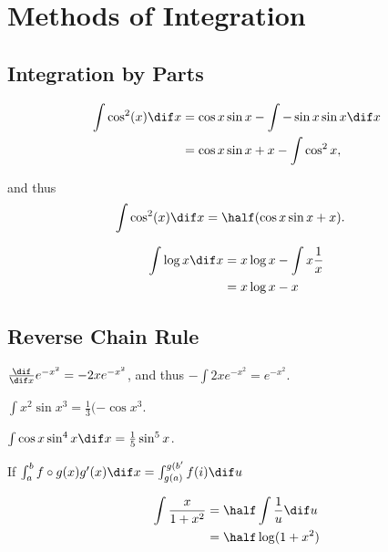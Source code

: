 \documentclass[11pt]{scrartcl}
\begin{document}
\section{Methods of Integration}
\subsection{Integration by Parts}
\begin{example}
  \begin{align}
    \int \cos^2(x) \dif x & = \cos x \sin x - \int -\sin x \sin x \dif x \\
                          & =\cos x \sin x + x - \int \cos^2x,
  \end{align}

  and thus
  \begin{align}
    \int \cos^2(x) \dif x & = \half(\cos x \sin x + x).
  \end{align}
\end{example}
\begin{example}

  \begin{align}
    \int \log x \dif x & = x \log x - \int x \frac{1}{x} \\
                       & = x\log x - x
  \end{align}
\end{example}
\subsection{Reverse Chain Rule}

\begin{example}

  $\frac{\dif }{\dif x}e^{-x^2} = -2xe^{-x^2}$, and thus $-\int 2x e^{-x^2} = e^{-x^2}$.
\end{example}
\begin{example}

$\int x^2 \sin x^3 = \frac{1}{3}(-\cos x^3$.

\end{example}
\begin{example}

  $\int \cos x \sin ^4x \dif x = \frac{1}{5}\sin^5x$.

\end{example}

\begin{theorem}
  If $\int_a^bf\circ g(x) g'(x) \dif x = \int_{g(a)}^{g(b'}f(i) \dif u$
\end{theorem}
\begin{example}

  \begin{align}
    \int \frac{x}{1+x^2} & = \half \int \frac{1}{u} \dif u \\
                         & =\half \log(1+x^2)
  \end{align}
\end{example}
\end{document}
